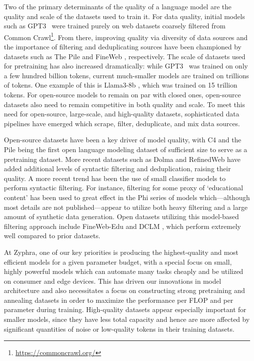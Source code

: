 \documentclass[conference]{IEEEtran}
\begin{document}
Two of the primary determinants of the quality of a language model are the quality and scale of the datasets used to train it.
For data quality, initial models such as GPT3~\citep{gpt3} were trained purely on web datasets coarsely filtered from Common Crawl\footnote{\url{https://commoncrawl.org/}}. From there, improving quality via diversity of data sources and the importance of filtering and deduplicating sources have been championed by datasets such as The Pile \citep{gao2020pile} and FineWeb \citep{penedo2024fineweb}, respectively.
The scale of datasets used for pretraining has also increased dramatically: while GPT3~\citep{gpt3} was trained on only a few hundred billion tokens, current much-smaller models are trained on trillions of tokens. One example of this is Llama3-8b \citep{llama3}, which was trained on 15 trillion tokens. 
For open-source models to remain on par with closed ones, open-source datasets also need to remain competitive in both quality and scale. To meet this need for open-source, large-scale, and high-quality datasets, sophisticated data pipelines have emerged which scrape, filter, deduplicate, and mix data sources.

Open-source datasets have been a key driver of model quality, with C4 \citep{raffel2020exploring} and the Pile \citep{gao2020pile} being the first open language modeling dataset of sufficient size to serve as a pretraining dataset. More recent datasets such as Dolma \citep{soldaini2024dolma} and RefinedWeb \citep{penedo2023refinedweb} have added additional levels of syntactic filtering and deduplication, raising their quality. A more recent trend has been the use of small classifier models to perform syntactic filtering. For instance, filtering for some proxy of `educational content' has been used to great effect in the Phi \citep{abdin2024phi} series of models which---although most details are not published---appear to utilize both heavy filtering and a large amount of synthetic data generation. Open datasets utilizing this model-based filtering approach include FineWeb-Edu \citep{penedo2024fineweb} and DCLM \citep{li2024dclm}, which perform extremely well compared to prior datasets. 

At Zyphra, one of our key priorities is producing the highest-quality and most efficient models for a given parameter budget, with a special focus on small, highly powerful models which can automate many tasks cheaply and be utilized on consumer and edge devices. This has driven our innovations in model architecture \citep{glorioso2024zamba,anthony2024blackmamba} and also necessitates a focus on constructing strong pretraining and annealing datasets in order to maximize the performance per FLOP and per parameter during training. High-quality datasets appear especially important for smaller models, since they have less total capacity and hence are more affected by significant quantities of noise or low-quality tokens in their training datasets.
\end{document}
